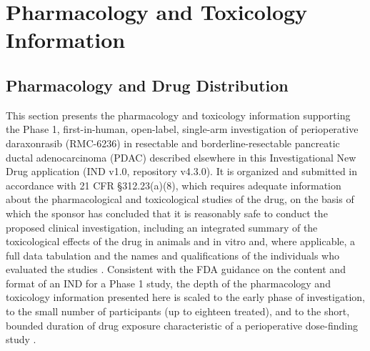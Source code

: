 \section{Pharmacology and Toxicology Information}

\subsection{Pharmacology and Drug Distribution}

This section presents the pharmacology and toxicology information supporting the
Phase 1, first-in-human, open-label, single-arm investigation of perioperative
daraxonrasib (RMC-6236) in resectable and borderline-resectable pancreatic
ductal adenocarcinoma (PDAC) described elsewhere in this Investigational New
Drug application (IND v1.0, repository v4.3.0). It is organized and submitted in
accordance with 21 CFR \S 312.23(a)(8), which requires adequate information
about the pharmacological and toxicological studies of the drug, on the basis of
which the sponsor has concluded that it is reasonably safe to conduct the
proposed clinical investigation, including an integrated summary of the
toxicological effects of the drug in animals and in vitro and, where applicable,
a full data tabulation and the names and qualifications of the individuals who
evaluated the studies \cite{phase1guidance}. Consistent with the FDA guidance on
the content and format of an IND for a Phase 1 study, the depth of the
pharmacology and toxicology information presented here is scaled to the early
phase of investigation, to the small number of participants (up to eighteen
treated), and to the short, bounded duration of drug exposure characteristic of
a perioperative dose-finding study \cite{phase1guidance}.

